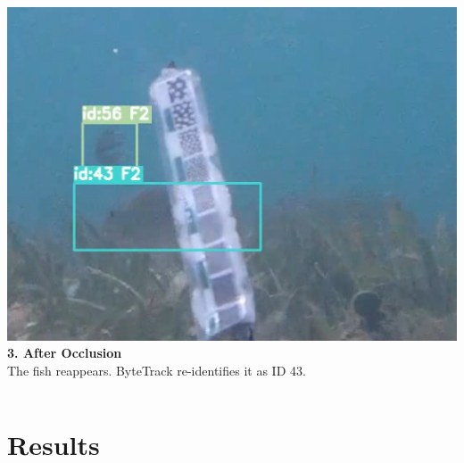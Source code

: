 \documentclass[serif]{beamer}  %
\begin{document}
\begin{frame}
\begin{columns}[T,totalwidth=\textwidth]
        \begin{column}{0.32\textwidth}
            \centering
            \includegraphics[width=\linewidth]{images/occlusion_3.png}
            \vspace{0.5em}
            \tiny
            \textbf{3. After Occlusion} \\
            The fish reappears. ByteTrack re-identifies it as ID 43.
        \end{column}
    \end{columns}
\end{frame}


\section{Results}
\end{document}
